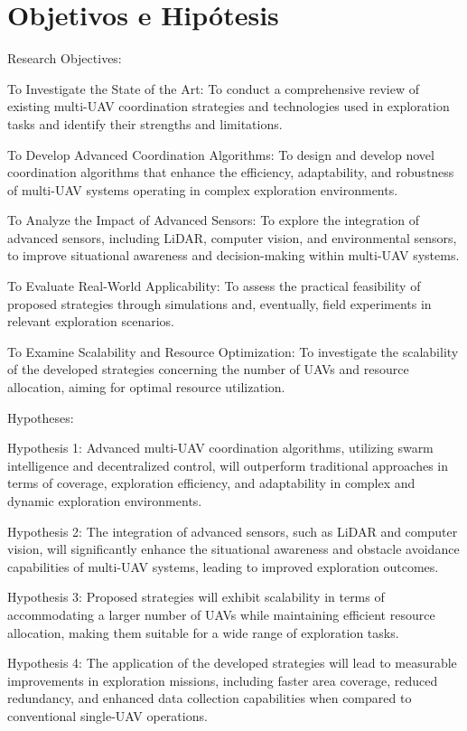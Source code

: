\documentclass[sigconf]{acmart}
\begin{document}
\section{Objetivos e Hipótesis}

Research Objectives:

    To Investigate the State of the Art: To conduct a comprehensive review of existing multi-UAV coordination strategies and technologies used in exploration tasks and identify their strengths and limitations.

    To Develop Advanced Coordination Algorithms: To design and develop novel coordination algorithms that enhance the efficiency, adaptability, and robustness of multi-UAV systems operating in complex exploration environments.

    To Analyze the Impact of Advanced Sensors: To explore the integration of advanced sensors, including LiDAR, computer vision, and environmental sensors, to improve situational awareness and decision-making within multi-UAV systems.

    To Evaluate Real-World Applicability: To assess the practical feasibility of proposed strategies through simulations and, eventually, field experiments in relevant exploration scenarios.

    To Examine Scalability and Resource Optimization: To investigate the scalability of the developed strategies concerning the number of UAVs and resource allocation, aiming for optimal resource utilization.

Hypotheses:

    Hypothesis 1: Advanced multi-UAV coordination algorithms, utilizing swarm intelligence and decentralized control, will outperform traditional approaches in terms of coverage, exploration efficiency, and adaptability in complex and dynamic exploration environments.

    Hypothesis 2: The integration of advanced sensors, such as LiDAR and computer vision, will significantly enhance the situational awareness and obstacle avoidance capabilities of multi-UAV systems, leading to improved exploration outcomes.

    Hypothesis 3: Proposed strategies will exhibit scalability in terms of accommodating a larger number of UAVs while maintaining efficient resource allocation, making them suitable for a wide range of exploration tasks.

    Hypothesis 4: The application of the developed strategies will lead to measurable improvements in exploration missions, including faster area coverage, reduced redundancy, and enhanced data collection capabilities when compared to conventional single-UAV operations.
\end{document}
